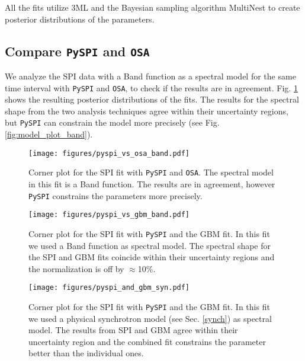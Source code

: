 \documentclass[twocolumn,traditabstract]{aa}
\begin{document}
All the fits utilize 3ML \citep{3ML} and the Bayesian sampling algorithm MultiNest \citep{multinest} to create posterior distributions of the parameters.



\subsection{Compare {\tt PySPI} and {\tt OSA}}
\label{pyspi_osa}
We analyze the SPI data with a Band function as a spectral model for the same time interval with {\tt PySPI} and {\tt OSA}, to check if the results are in agreement. Fig. \ref{fig:corner_osa_pyspi_band} shows the resulting posterior distributions of the fits. The results for the spectral shape from the two analysis techniques agree within their uncertainty regions, but {\tt PySPI} can constrain the model more precisely (see Fig. \ref{fig:model_plot_band}).

\begin{figure}
  \begin{centering}
    \texttt{[image: figures/pyspi\_vs\_osa\_band.pdf]}
    \caption{Corner plot for the SPI fit with {\tt PySPI} and {\tt OSA}. The spectral model in this fit is a Band function. The results are in agreement, however {\tt PySPI} constrains the parameters more precisely.}
    \label{fig:corner_osa_pyspi_band}
  \end{centering}
\end{figure}
\begin{figure}
  \begin{centering}
    \texttt{[image: figures/pyspi\_vs\_gbm\_band.pdf]}
    \caption{Corner plot for the SPI fit with {\tt PySPI} and the GBM fit. In this fit we used a Band function as spectral model. The spectral shape for the SPI and GBM fits coincide within their uncertainty regions and the normalization is off by $\approx$10\%.}
    \label{fig:corner_gbm_pyspi_band}
  \end{centering}
\end{figure}
\begin{figure}
  \begin{centering}
    \texttt{[image: figures/pyspi\_and\_gbm\_syn.pdf]}
    \caption{Corner plot for the SPI fit with {\tt PySPI} and the GBM fit. In this fit we used a physical synchrotron model (see Sec. \ref{synch}) as spectral model. The results from SPI and GBM agree within their uncertainty region and the combined fit constrains the parameter better than the individual ones.}
    \label{fig:corner_gbm_pyspi_joined_syn}
  \end{centering}
\end{figure}
\end{document}
